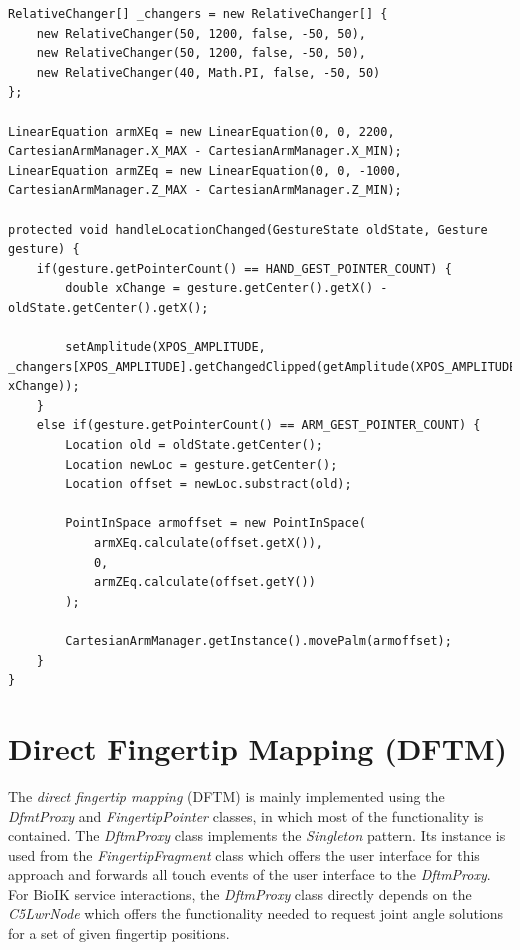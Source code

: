 \begin{lstlisting}[caption={Example usage of RelativeChanger in RelativeSynergyProxy},label=lst:impl:syn:expl]
RelativeChanger[] _changers = new RelativeChanger[] {
	new RelativeChanger(50, 1200, false, -50, 50),
	new RelativeChanger(50, 1200, false, -50, 50),
	new RelativeChanger(40, Math.PI, false, -50, 50)
};

LinearEquation armXEq = new LinearEquation(0, 0, 2200, CartesianArmManager.X_MAX - CartesianArmManager.X_MIN);
LinearEquation armZEq = new LinearEquation(0, 0, -1000, CartesianArmManager.Z_MAX - CartesianArmManager.Z_MIN);

protected void handleLocationChanged(GestureState oldState, Gesture gesture) {
	if(gesture.getPointerCount() == HAND_GEST_POINTER_COUNT) {
		double xChange = gesture.getCenter().getX() - oldState.getCenter().getX();
		
		setAmplitude(XPOS_AMPLITUDE, _changers[XPOS_AMPLITUDE].getChangedClipped(getAmplitude(XPOS_AMPLITUDE), xChange));
	}
	else if(gesture.getPointerCount() == ARM_GEST_POINTER_COUNT) {
		Location old = oldState.getCenter();
		Location newLoc = gesture.getCenter();
		Location offset = newLoc.substract(old);
		
		PointInSpace armoffset = new PointInSpace(
			armXEq.calculate(offset.getX()),
			0,
			armZEq.calculate(offset.getY())
		);
		
		CartesianArmManager.getInstance().movePalm(armoffset);
	}
}
\end{lstlisting}


\section{Direct Fingertip Mapping (DFTM)}
\label{sec:impl:dfmt}

The \textit{direct fingertip mapping} (DFTM) is mainly implemented using the \textit{DfmtProxy} and \textit{FingertipPointer} classes, in which most of the functionality is contained. The \textit{DftmProxy} class implements the \textit{Singleton} pattern. Its instance is used from the \textit{FingertipFragment} class which offers the user interface for this approach and forwards all touch events of the user interface to the \textit{DftmProxy}. For BioIK service interactions, the \textit{DftmProxy} class directly depends on the \textit{C5LwrNode} which offers the functionality needed to request joint angle solutions for a set of given fingertip positions.

